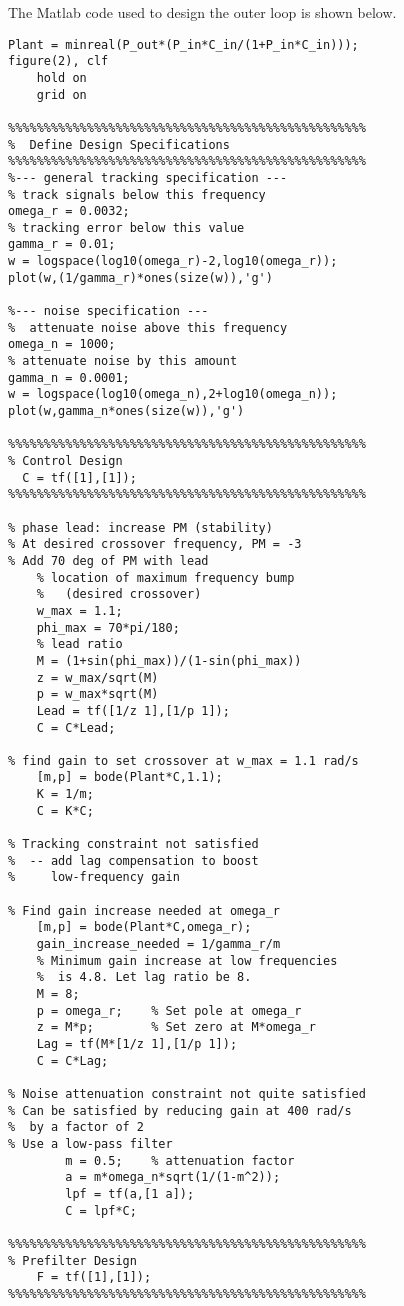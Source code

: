 The Matlab code used to design the outer loop is shown below.
\begin{lstlisting}
Plant = minreal(P_out*(P_in*C_in/(1+P_in*C_in)));
figure(2), clf
    hold on
    grid on

%%%%%%%%%%%%%%%%%%%%%%%%%%%%%%%%%%%%%%%%%%%%%%%%%%
%  Define Design Specifications
%%%%%%%%%%%%%%%%%%%%%%%%%%%%%%%%%%%%%%%%%%%%%%%%%%
%--- general tracking specification ---
% track signals below this frequency
omega_r = 0.0032; 
% tracking error below this value
gamma_r = 0.01;  
w = logspace(log10(omega_r)-2,log10(omega_r));
plot(w,(1/gamma_r)*ones(size(w)),'g')
        
%--- noise specification ---
%  attenuate noise above this frequency
omega_n = 1000;  
% attenuate noise by this amount
gamma_n = 0.0001;   
w = logspace(log10(omega_n),2+log10(omega_n));
plot(w,gamma_n*ones(size(w)),'g')
        
%%%%%%%%%%%%%%%%%%%%%%%%%%%%%%%%%%%%%%%%%%%%%%%%%%
% Control Design
  C = tf([1],[1]);
%%%%%%%%%%%%%%%%%%%%%%%%%%%%%%%%%%%%%%%%%%%%%%%%%%

% phase lead: increase PM (stability)
% At desired crossover frequency, PM = -3
% Add 70 deg of PM with lead
    % location of maximum frequency bump 
    %   (desired crossover)
    w_max = 1.1;
    phi_max = 70*pi/180;
    % lead ratio
    M = (1+sin(phi_max))/(1-sin(phi_max)) 
    z = w_max/sqrt(M)
    p = w_max*sqrt(M)
    Lead = tf([1/z 1],[1/p 1]);
    C = C*Lead;

% find gain to set crossover at w_max = 1.1 rad/s
    [m,p] = bode(Plant*C,1.1);
    K = 1/m;
    C = K*C;

% Tracking constraint not satisfied 
%  -- add lag compensation to boost 
%     low-frequency gain

% Find gain increase needed at omega_r
    [m,p] = bode(Plant*C,omega_r);
    gain_increase_needed = 1/gamma_r/m
    % Minimum gain increase at low frequencies 
    %  is 4.8. Let lag ratio be 8.
    M = 8;
    p = omega_r;    % Set pole at omega_r
    z = M*p;        % Set zero at M*omega_r
    Lag = tf(M*[1/z 1],[1/p 1]);
    C = C*Lag;

% Noise attenuation constraint not quite satisfied
% Can be satisfied by reducing gain at 400 rad/s 
%  by a factor of 2
% Use a low-pass filter
        m = 0.5;    % attenuation factor
        a = m*omega_n*sqrt(1/(1-m^2));
        lpf = tf(a,[1 a]);
        C = lpf*C;

%%%%%%%%%%%%%%%%%%%%%%%%%%%%%%%%%%%%%%%%%%%%%%%%%%
% Prefilter Design
    F = tf([1],[1]);
%%%%%%%%%%%%%%%%%%%%%%%%%%%%%%%%%%%%%%%%%%%%%%%%%%


\end{lstlisting}
